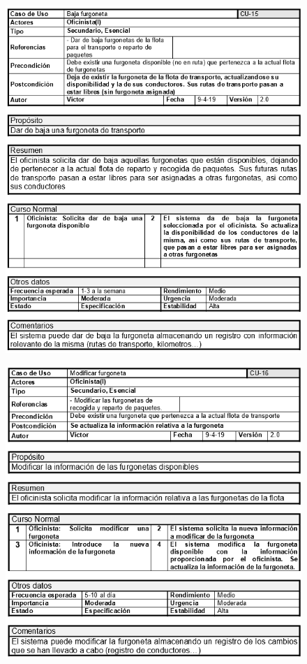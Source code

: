\begin{figure}[H]
	\centering
	\includegraphics[width=16cm]{15}
\end{figure}
\begin{figure}[H]
	\centering
	\includegraphics[width=16cm]{16}
\end{figure}
